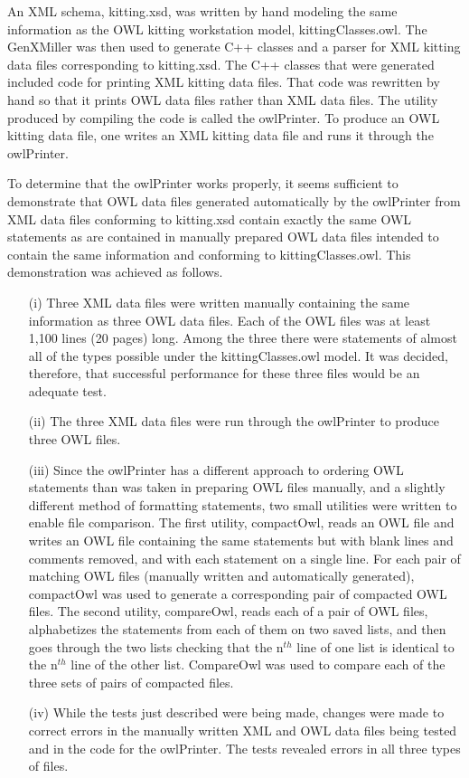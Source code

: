 An XML schema, kitting.xsd, was written by hand modeling the same
information as the OWL kitting workstation model, kittingClasses.owl. The
GenXMiller was then used to generate C++ classes and a parser for XML
kitting data files corresponding to kitting.xsd. The C++ classes that were
generated included code for printing XML kitting data
files. That code was rewritten by hand so that it prints OWL data files
rather than XML data files. The utility produced by compiling the code is
called the owlPrinter. To produce an OWL kitting data file, one writes an
XML kitting data file and runs it through the owlPrinter.

To determine that the owlPrinter works properly, it seems sufficient to
demonstrate that OWL data files generated automatically by the owlPrinter
from XML data files conforming to kitting.xsd contain exactly the same OWL
statements as are contained in manually prepared OWL data files intended to
contain the same information and conforming to kittingClasses.owl. This
demonstration was achieved as follows.

\begin{enumerate}
\item[ (i) ] Three XML data files were written manually containing the same
  information as three OWL data files. Each of the OWL files was at least
  1,100 lines (20 pages) long. Among the three there were statements of
  almost all of the types possible under the kittingClasses.owl model. It was
  decided, therefore, that successful performance for these three files
  would be an adequate test.
\item[ (ii) ] The three XML data files were run through the owlPrinter to produce
  three OWL files.
\item[ (iii) ] Since the owlPrinter has a different approach to ordering OWL
  statements than was taken in preparing OWL files manually, and a slightly
  different method of formatting statements, two small utilities were
  written to enable file comparison. The first utility, compactOwl, reads
  an OWL file and writes an OWL file containing the same statements but
  with blank lines and comments removed, and with each statement on a
  single line. For each pair of matching OWL files (manually written and
  automatically generated), compactOwl was used to generate a corresponding
  pair of compacted OWL files. The second utility, compareOwl, reads each
  of a pair of OWL files, alphabetizes the statements from each of them on
  two saved lists, and then goes through the two lists checking that the
  n$^{th}$ line of one list is identical to the n$^{th}$ line of the other list.
  CompareOwl was used to compare each of the three sets of pairs of
  compacted files.
\item[ (iv) ] While the tests just described were being made, changes were made to
  correct errors in the manually written XML and OWL data files being
  tested and in the code for the owlPrinter. The tests revealed errors in
  all three types of files.
\end{enumerate}

